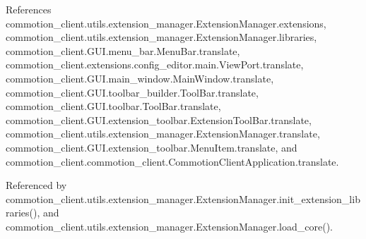 References commotion\-\_\-client.\-utils.\-extension\-\_\-manager.\-Extension\-Manager.\-extensions, commotion\-\_\-client.\-utils.\-extension\-\_\-manager.\-Extension\-Manager.\-libraries, commotion\-\_\-client.\-G\-U\-I.\-menu\-\_\-bar.\-Menu\-Bar.\-translate, commotion\-\_\-client.\-extensions.\-config\-\_\-editor.\-main.\-View\-Port.\-translate, commotion\-\_\-client.\-G\-U\-I.\-main\-\_\-window.\-Main\-Window.\-translate, commotion\-\_\-client.\-G\-U\-I.\-toolbar\-\_\-builder.\-Tool\-Bar.\-translate, commotion\-\_\-client.\-G\-U\-I.\-toolbar.\-Tool\-Bar.\-translate, commotion\-\_\-client.\-G\-U\-I.\-extension\-\_\-toolbar.\-Extension\-Tool\-Bar.\-translate, commotion\-\_\-client.\-utils.\-extension\-\_\-manager.\-Extension\-Manager.\-translate, commotion\-\_\-client.\-G\-U\-I.\-extension\-\_\-toolbar.\-Menu\-Item.\-translate, and commotion\-\_\-client.\-commotion\-\_\-client.\-Commotion\-Client\-Application.\-translate.



Referenced by commotion\-\_\-client.\-utils.\-extension\-\_\-manager.\-Extension\-Manager.\-init\-\_\-extension\-\_\-libraries(), and commotion\-\_\-client.\-utils.\-extension\-\_\-manager.\-Extension\-Manager.\-load\-\_\-core().


